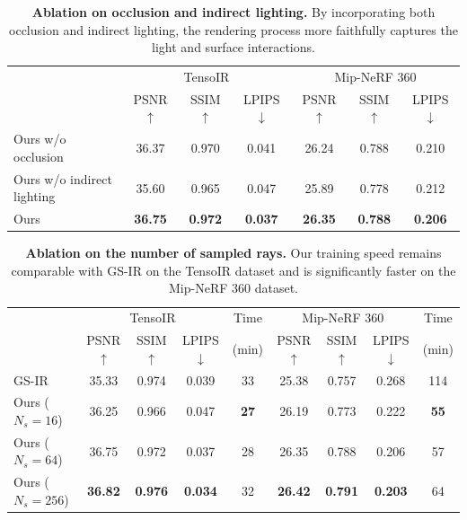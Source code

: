 \documentclass{article} %
\begin{document}
\begin{table}[t]
    \footnotesize
    \centering
    \renewcommand{\arraystretch}{1}
    \caption{\textbf{Ablation on occlusion and indirect lighting.} By incorporating both occlusion and indirect lighting, the rendering process more faithfully captures the light and surface interactions.}
    \label{tab:ablation1}
    \begin{tabular}{lccc|ccc}
         \hline & \multicolumn{3}{c}{TensoIR } & \multicolumn{3}{c}{    Mip-NeRF 360 } \\
        & PSNR $\uparrow$ & SSIM $\uparrow$ & LPIPS $\downarrow$ & PSNR $\uparrow$ & SSIM $\uparrow$ & LPIPS $\downarrow$\\
        \hline Ours w/o occlusion & 36.37 & 0.970 &  0.041  & 26.24 &  0.788 &  0.210\\
         Ours w/o indirect lighting & 35.60 & 0.965 & 0.047 & 25.89 & 0.778 & 0.212\\
        Ours & \textbf{36.75} & \textbf{0.972} & \textbf{0.037} & \textbf{26.35} & \textbf{0.788} & \textbf{0.206}\\
        \hline 
    \end{tabular}
\end{table}

\begin{table}[t]
    \footnotesize
    \centering
    \renewcommand{\arraystretch}{1}
    \setlength{\tabcolsep}{1mm}{}
    \caption{\textbf{Ablation on the number of sampled rays.} Our training speed remains comparable with GS-IR on the TensoIR dataset and is significantly faster on the Mip-NeRF 360 dataset. %
    }
    \label{tab:ablation2}
    \begin{tabular}{lccc|c|ccc|c}
         \hline & \multicolumn{3}{c}{TensoIR } & \multicolumn{1}{c}{Time} &\multicolumn{3}{c}{    Mip-NeRF 360 }& \multicolumn{1}{c}{Time} \\
        & PSNR $\uparrow$ & SSIM $\uparrow$ & LPIPS  $\downarrow$ & (min) & PSNR $\uparrow$ & SSIM $\uparrow$ & LPIPS $\downarrow$ & (min)\\
        \hline GS-IR & 35.33 & 0.974 & 0.039 & 33 & 25.38 & 0.757 & 0.268 & 114 \\
        Ours ($N_s=16$) & 36.25 & 0.966 &  0.047 & \textbf{27}  & 26.19 &  0.773 &  0.222 & \textbf{55}\\
         Ours ($N_s=64$) & 36.75 & 0.972 & 0.037 & 28 & 26.35 & 0.788 & 0.206 & 57\\
        Ours ($N_s=256$) & \textbf{36.82} & \textbf{0.976} & \textbf{0.034}  & 32 & \textbf{26.42} & \textbf{0.791} & \textbf{0.203}  & 64\\
        \hline 
    \end{tabular}
    \vspace{-10pt}
\end{table}
\end{document}
